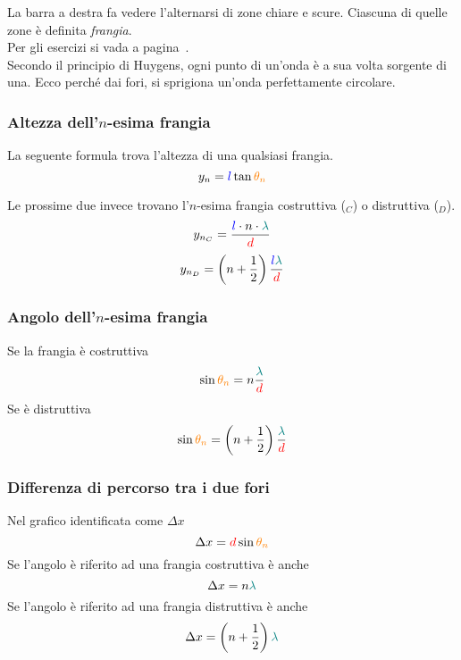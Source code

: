 La barra a destra fa vedere l'alternarsi di zone chiare e scure. Ciascuna di quelle zone è definita
\emph{frangia}.\\
Per gli esercizi si vada a pagina~\pageref{ex:young}.\\ [\baselineskip]
Secondo il principio di Huygens, ogni punto di un'onda è a sua volta sorgente di una. Ecco perché
dai fori, si sprigiona un'onda perfettamente circolare.

\subsubsection{Altezza dell'$n$-esima frangia}
La seguente formula trova l'altezza di una qualsiasi frangia.
\begin{equation*}
  y_n = \mathcolor{blue}{l}\tan\mathcolor{orange}{\theta_n}
\end{equation*}

Le prossime due invece trovano l'$n$-esima frangia costruttiva ($_C$) o distruttiva ($_D$).
\begin{equation*}
  y_{n_C} = \frac{\mathcolor{blue}{l}\cdot n\cdot\mathcolor{teal}{\lambda}}{\mathcolor{red}{d}}
\end{equation*}
\begin{equation*}
  y_{n_D} =
  \left(n+\frac{1}{2}\right)\frac{\mathcolor{blue}{l}\mathcolor{teal}{\lambda}}{\mathcolor{red}{d}}
\end{equation*}

\subsubsection{Angolo dell'$n$-esima frangia}
Se la frangia è costruttiva
\begin{equation*}
\sin\mathcolor{orange}{\theta_n} = n\frac{\mathcolor{teal}{\lambda}}{\mathcolor{red}{d}}
\end{equation*}
Se è distruttiva
\begin{equation*}
\sin\mathcolor{orange}{\theta_n} =
\left(n+\frac{1}{2}\right)\frac{\mathcolor{teal}{\lambda}}{\mathcolor{red}{d}}
\end{equation*}

\subsubsection{Differenza di percorso tra i due fori}
Nel grafico identificata come $\Delta x$
\begin{equation*}
\Delta x = \mathcolor{red}{d}\sin\mathcolor{orange}{\theta_n}
\end{equation*}
Se l'angolo è riferito ad una frangia costruttiva è anche
\begin{equation*}
\Delta x = n\mathcolor{teal}{\lambda}
\end{equation*}
Se l'angolo è riferito ad una frangia distruttiva è anche
\begin{equation*}
\Delta x = \left(n+\frac{1}{2}\right)\mathcolor{teal}{\lambda}
\end{equation*}

